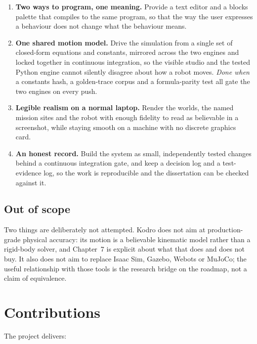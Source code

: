 \documentclass[11pt,a4paper]{report}
\begin{document}
\begin{enumerate}[label=O\arabic*., start=7]
\item {} \textbf{Two ways to program, one meaning.} Provide a text editor and a blocks palette that compiles to the same program, so that the way the user expresses a behaviour does not change what the behaviour means.
\item {} \textbf{One shared motion model.} Drive the simulation from a single set of closed-form equations and constants, mirrored across the two engines and locked together in continuous integration, so the visible studio and the tested Python engine cannot silently disagree about how a robot moves. \emph{Done when} a constants hash, a golden-trace corpus and a formula-parity test all gate the two engines on every push.
\item {} \textbf{Legible realism on a normal laptop.} Render the worlds, the named mission sites and the robot with enough fidelity to read as believable in a screenshot, while staying smooth on a machine with no discrete graphics card.
\item {} \textbf{An honest record.} Build the system as small, independently tested changes behind a continuous integration gate, and keep a decision log and a test-evidence log, so the work is reproducible and the dissertation can be checked against it.
\end{enumerate}

\subsection{Out of scope}
Two things are deliberately not attempted. Kodro does not aim at production-grade physical accuracy: its motion is a believable kinematic model rather than a rigid-body solver, and Chapter~7 is explicit about what that does and does not buy. It also does not aim to replace Isaac Sim, Gazebo, Webots or MuJoCo; the useful relationship with those tools is the research bridge on the roadmap, not a claim of equivalence.

\section{Contributions}
\label{sec:contributions}
The project delivers:
\end{document}
